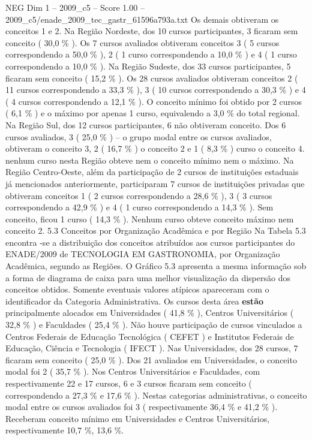 \begin{textsample}{NEG Dim 1 – 2009\_c5 – Score 1.00 – 2009\_c5/enade\_2009\_tec\_gastr\_61596a793a.txt}
Os demais obtiveram os conceitos 1 e 2.
Na Região Nordeste, dos 10 cursos participantes, 3 ficaram sem conceito ( 30,0 \% ).
Os 7 cursos avaliados obtiveram conceitos 3 ( 5 cursos correspondendo a 50,0 \% ), 2 ( 1 curso correspondendo a 10,0 \% ) e 4 ( 1 curso correspondendo a 10,0 \% ).
Na Região Sudeste, dos 33 cursos participantes, 5 ficaram sem conceito ( 15,2 \% ).
Os 28 cursos avaliados obtiveram conceitos 2 ( 11 cursos correspondendo a 33,3 \% ), 3 ( 10 cursos correspondendo a 30,3 \% ) e 4 ( 4 cursos correspondendo a 12,1 \% ).
O conceito mínimo foi obtido por 2 cursos ( 6,1 \% ) e o máximo por apenas 1 curso, equivalendo a 3,0 \% do total regional.
Na Região Sul, dos 12 cursos participantes, 6 não obtiveram conceito.
Dos 6 cursos avaliados, 3 ( 25,0 \% ) – o grupo modal entre os cursos avaliados, obtiveram o conceito 3, 2 ( 16,7 \% ) o conceito 2 e 1 ( 8,3 \% ) curso o conceito 4. nenhum curso nesta Região obteve nem o conceito mínimo nem o máximo.
Na Região Centro-Oeste, além da participação de 2 cursos de instituições estaduais já mencionados anteriormente, participaram 7 cursos de instituições privadas que obtiveram conceitos 1 ( 2 cursos correspondendo a 28,6 \% ), 3 ( 3 cursos correspondendo a 42,9 \% ) e 4 ( 1 curso correspondendo a 14,3 \% ).
Sem conceito, ficou 1 curso ( 14,3 \% ).
Nenhum curso obteve conceito máximo nem conceito 2. 5.3 Conceitos por Organização Acadêmica e por Região Na Tabela 5.3 encontra -se a distribuição dos conceitos atribuídos aos cursos participantes do ENADE/2009 de TECNOLOGIA EM GASTRONOMIA, por Organização Acadêmica, segundo as Regiões.
O Gráfico 5.3 apresenta a mesma informação sob a forma de diagrama de caixa para uma melhor visualização da dispersão dos conceitos obtidos.
Somente eventuais valores atípicos apareceram com o identificador da Categoria Administrativa.
Os cursos desta área \textbf{estão} principalmente alocados em Universidades ( 41,8 \% ), Centros Universitários ( 32,8 \% ) e Faculdades ( 25,4 \% ).
Não houve participação de cursos vinculados a Centros Federais de Educação Tecnológica ( CEFET ) e Institutos Federais de Educação, Ciência e Tecnologia ( IFECT ).
Nas Universidades, dos 28 cursos, 7 ficaram sem conceito ( 25,0 \% ).
Dos 21 avaliados em Universidades, o conceito modal foi 2 ( 35,7 \% ).
Nos Centros Universitários e Faculdades, com respectivamente 22 e 17 cursos, 6 e 3 cursos ficaram sem conceito ( correspondendo a 27,3 \% e 17,6 \% ).
Nestas categorias administrativas, o conceito modal entre os cursos avaliados foi 3 ( respectivamente 36,4 \% e 41,2 \% ).
Receberam conceito mínimo em Universidades e Centros Universitários, respectivamente 10,7 \%, 13,6 \%.

\end{textsample}
